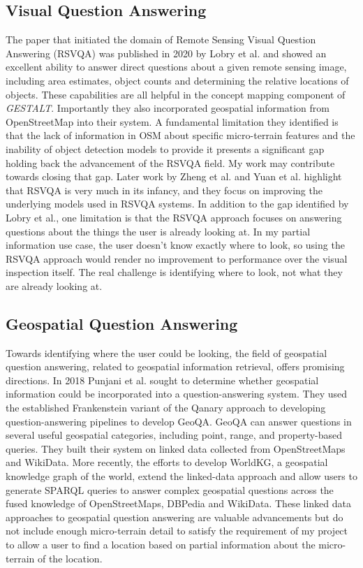 \subsection{Visual Question Answering}
The paper that initiated the domain of Remote Sensing Visual Question Answering (RSVQA) was published in 2020 by Lobry et al. and showed an excellent ability to answer direct questions about a given remote sensing image, including area estimates, object counts and determining the relative locations of objects\cite{Lobry2020}. 
These capabilities are all helpful in the concept mapping component of \textit{GESTALT}. Importantly they also incorporated geospatial information from OpenStreetMap into their system. 
A fundamental limitation they identified is that the lack of information in OSM about specific micro-terrain features and the inability of object detection models to provide it presents a significant gap holding back the advancement of the RSVQA field. 
My work may contribute towards closing that gap. Later work by Zheng et al. and Yuan et al. highlight that RSVQA is very much in its infancy, and they focus on improving the underlying models used in RSVQA systems\cite{Zheng2021, Yuan2022}.
In addition to the gap identified by Lobry et al., one limitation is that the RSVQA approach focuses on answering questions about the things the user is already looking at. 
In my partial information use case, the user doesn't know exactly where to look, so using the RSVQA approach would render no improvement to performance over the visual inspection itself. 
The real challenge is identifying where to look, not what they are already looking at.

\subsection{Geospatial Question Answering}
 
Towards identifying where the user could be looking, the field of geospatial question answering, related to geospatial information retrieval, offers promising directions. 
In 2018 Punjani et al. sought to determine whether geospatial information could be incorporated into a question-answering system\cite{Punjani2018}. 
They used the established Frankenstein variant of the Qanary approach to developing question-answering pipelines to develop GeoQA. 
GeoQA can answer questions in several useful geospatial categories, including point, range, and property-based queries. 
They built their system on linked data collected from OpenStreetMaps and WikiData. 
More recently, the efforts to develop WorldKG, a geospatial knowledge graph of the world, extend the linked-data approach and allow users to generate SPARQL queries to answer complex geospatial questions across the fused knowledge of OpenStreetMaps, DBPedia and WikiData\cite{dsouza2021}. 
These linked data approaches to geospatial question answering are valuable advancements but do not include enough micro-terrain detail to satisfy the requirement of my project to allow a user to find a location based on partial information about the micro-terrain of the location.


